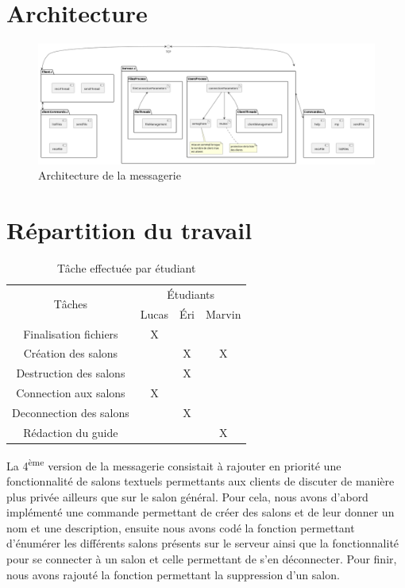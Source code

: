 \documentclass[a4paper,12pt]{article}
\begin{document}
\pagebreak
\section{Architecture}
\begin{figure}[h]
	\centering
	\includegraphics[width=\linewidth]{architecture.png}
	\caption{Architecture de la messagerie}
	\hrulefill
\end{figure}
\section{Répartition du travail}
\begin{table}
	\vspace{-0.5cm}
	\begin{tabular}{cccc}
		\toprule
		\multirow{2}{*}{Tâches} & \multicolumn{3}{c}{Étudiants}\\
		& Lucas & Éri & Marvin\\
		\midrule
		Finalisation fichiers & X\\
		\midrule
		Création des salons & & X & X\\
		\midrule
		Destruction des salons & & X &\\
		\midrule
		Connection aux salons & X\\
		\midrule
		Deconnection des salons & & X\\
		\midrule
		Rédaction du guide & & & X\\
		\bottomrule
	\end{tabular}
	\caption{Tâche effectuée par étudiant}
	\label{table:repartition}
\end{table}
La 4\textsuperscript{ème} version de la messagerie consistait à rajouter en priorité une fonctionnalité de salons textuels permettants aux clients de discuter de manière plus privée ailleurs que sur le salon général. Pour cela, nous avons d'abord implémenté une commande permettant de créer des salons et de leur donner un nom et une description, ensuite nous avons codé la fonction permettant d'énumérer les différents salons présents sur le serveur ainsi que la fonctionnalité pour se connecter à un salon et celle permettant de s'en déconnecter. Pour finir, nous avons rajouté la fonction permettant la suppression d'un salon.
\end{document}
